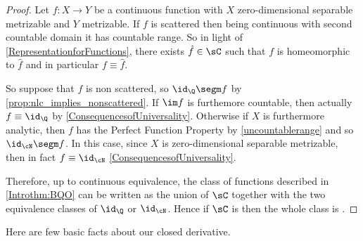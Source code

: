 \begin{proof}
Let $f:X\to Y$ be a continuous function with $X$ zero-dimensional separable metrizable and $Y$ metrizable. If $f$ is scattered then being continuous with second countable domain it has countable range. So in light of \cref{RepresentationforFunctions}, there exists $\hat{f}\in\sC$ such that $f$ is homeomorphic to $\hat{f}$ and in particular $f\equiv \hat{f}$.

So suppose that $f$ is non scattered, so $\id_\Q\segm f$ by \cref{prop:nlc_implies_nonscattered}. If $\im f$ is furthemore countable, then actually $f\equiv \id_\Q$ by \cref{ConsequencesofUniversality}. Otherwise if $X$ is furthermore analytic, then $f$ has the Perfect Function Property by \cref{uncountablerange} and so $\id_{\cN}\segm f$. In this case, since $X$ is zero-dimen\-sional separable metrizable, then in fact $f\equiv \id_{\cN}$ \cref{ConsequencesofUniversality}.

Therefore, up to continuous equivalence, the class of functions described in \cref{Introthm:BQO} can be written as the union of $\sC$ together with the two equivalence classes of $\id_\Q$ or $\id_{\cN}$. Hence if $\sC$ is \bqo{} then the whole class is \bqo{}.
\end{proof}

%
%
%
Here are few basic facts about our closed derivative.

